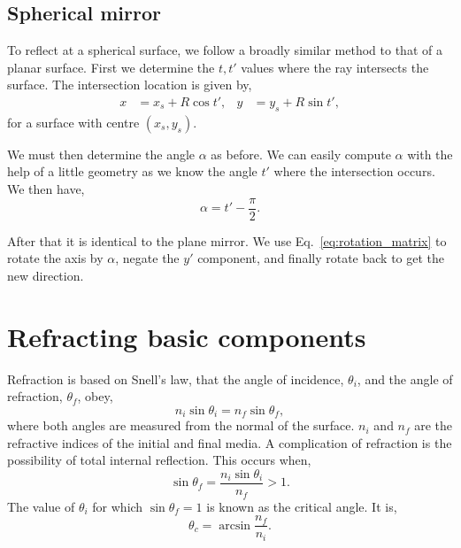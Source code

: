 \documentclass{article}
\begin{document}
\subsection{Spherical mirror}
To reflect at a spherical surface, we follow a broadly similar method to that of a planar surface. First we determine the $t, t'$ values where the ray intersects the surface. The intersection location is given by,
\begin{align}
    x
    &=
    x_s + R \cos t',
    &
    y
    &=
    y_s + R \sin t',
\end{align}
for a surface with centre $(x_s, y_s)$.

We must then determine the angle $\alpha$ as before. We can easily compute $\alpha$ with the help of a little geometry as we know the angle $t'$ where the intersection occurs. We then have,
\begin{equation}
    \label{eq:alpha_sph}
    \alpha = t' - \frac{\pi}{2}.
\end{equation}

After that it is identical to the plane mirror. We use Eq.~\ref{eq:rotation_matrix} to rotate the axis by $\alpha$, negate the $y'$ component, and finally rotate back to get the new direction.

\section{Refracting basic components}
Refraction is based on Snell's law, that the angle of incidence, $\theta_i$, and the angle of refraction, $\theta_f$, obey,
\begin{equation}
    n_i \sin \theta_i 
    =
    n_f \sin \theta_f,
\end{equation}
where both angles are measured from the normal of the surface. $n_i$ and $n_f$ are the refractive indices of the initial and final media. A complication of refraction is the possibility of total internal reflection. This occurs when,
\begin{equation}
    \sin \theta_f 
    =
    \frac{n_i \sin \theta_i}{n_f} > 1.
\end{equation}
The value of $\theta_i$ for which $\sin{\theta_f} = 1$ is known as the critical angle. It is,
\begin{equation}
    \theta_c
    =
    \arcsin{\frac{n_f}{n_i}}.
\end{equation}
\end{document}
